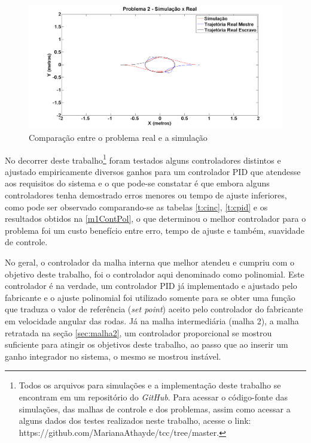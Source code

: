 \begin{figure}[!htb]
	\centering
	\includegraphics[width=.9\linewidth]{./Testes/Problema2/Incremental/simxReal}
	\caption{Comparação entre o problema real e a simulação}
	\label{fig:CompSimReal}
\end{figure}

No decorrer deste trabalho\footnote{Todos os arquivos para simulações e a implementação deste trabalho se encontram em um repositório do \emph{GitHub}. Para acessar o código-fonte das simulações, das malhas de controle e dos problemas, assim como acessar a alguns dados dos testes realizados neste trabalho, acesse o link: https://github.com/MarianaAthayde/tcc/tree/master.} foram testados alguns controladores distintos e ajustado empiricamente diversos ganhos para um controlador PID que atendesse aos requisitos do sistema e o que pode-se constatar é que embora alguns controladores tenha demostrado erros menores ou tempo de ajuste inferiores, como pode ser observado comparando-se as tabelas \ref{t:cinc}, \ref{t:cpid} e os resultados obtidos na \autoref{m1ContPol}, o que determinou o melhor controlador para o problema foi um custo benefício entre erro, tempo de ajuste e também, suavidade de controle. 

No geral, o controlador da malha interna que melhor atendeu e cumpriu com o objetivo deste trabalho, foi o controlador aqui denominado como polinomial. %
Este controlador é na verdade, um controlador PID já implementado e ajustado pelo fabricante e o ajuste polinomial foi utilizado somente para se obter uma função que traduza o valor de referência (\emph{set point}) aceito pelo controlador do fabricante em velocidade angular das rodas. Já na malha intermediária (malha 2), a malha retratada na seção \ref{sec:malha2}, um controlador proporcional se mostrou suficiente para atingir os objetivos deste trabalho, ao passo que ao inserir um ganho integrador no sistema, o mesmo se mostrou instável.

